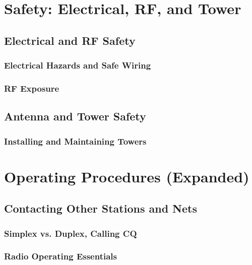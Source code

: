 \documentclass[12pt]{book}
\begin{document}
\part{Safety: Electrical, RF, and Tower}
\chapter{Electrical and RF Safety}
\section{Electrical Hazards and Safe Wiring}



\section{RF Exposure}

\chapter{Antenna and Tower Safety}
\section{Installing and Maintaining Towers}

\part{Operating Procedures (Expanded)}
\chapter{Contacting Other Stations and Nets}
\section{Simplex vs. Duplex, Calling CQ}

\section{Radio Operating Essentials}


\end{document}
